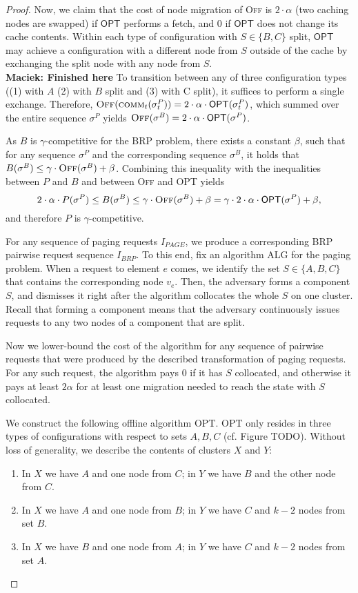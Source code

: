 \documentclass[manuscript,screen=true, review, anonymous]{acmart}
\newcommand{\OPT}{\textsf{OPT}\xspace}
\newcommand{\comm}{\textsc{comm}}
\newcommand{\OFF}{\textsc{Off}\xspace}
\newcommand\maciek[1]{\color{brown}\textbf{\\ Maciek: #1}\color{black}}
\begin{document}
\begin{proof}
Now, we claim that the cost of node migration of \OFF is $2 \cdot \alpha$ (two caching nodes are swapped) if $\OPT$ performs a fetch, and 0 if
$\OPT$ does not change its cache contents.
Within each type of configuration with $S \in \{ B, C\}$ split, $\OPT$ may achieve a configuration with a different node from $S$ outside of the cache by exchanging the split node with any node from $S$.
\maciek{Finished here}
To transition between any of three configuration types ((1) with $A$ (2) with $B$ split and (3) with C split), it suffices to perform a single exchange.
Therefore, $\OFF(\comm_t(\sigma^P_t)) = 2 \cdot \alpha \cdot \OPT(\sigma^P_t)$, which summed over the entire sequence $\sigma^P$ yields $\OFF(\sigma^B) = 2 \cdot \alpha \cdot \OPT(\sigma^P)$.

As $B$ is $\gamma$-competitive for the BRP problem, there exists a constant $\beta$, such that for any sequence $\sigma^P$ and the corresponding sequence $\sigma^B$, it holds that $B(\sigma^B) \leq \gamma \cdot \OFF(\sigma^B) +
\beta$.
Combining this inequality with the inequalities between $P$ and $B$ and between \OFF and \OPT yields
\[
	2 \cdot \alpha \cdot P(\sigma^P) \leq 
	B(\sigma^B) \leq \gamma \cdot \OFF(\sigma^B) + \beta
	 =\gamma \cdot 2 \cdot \alpha \cdot \OPT(\sigma^P) + \beta,
\]
and therefore $P$ is $\gamma$-competitive.
  \medskip

For any sequence of paging requests $I_{PAGE}$, we produce a corresponding BRP pairwise request sequence $I_{BRP}$.
To this end, fix an algorithm ALG for the paging problem.
When a request to element $e$ comes, we identify the set $S \in \{ A,B,C \}$ that contains the corresponding node $v_e$.
Then, the adversary forms a component $S$, and dismisses it right after the algorithm collocates the whole $S$ on one cluster.
Recall that forming a component means that the adversary continuously issues requests to any two nodes of a component that are split.

Now we lower-bound the cost of the algorithm for any sequence of pairwise requests that were produced by the described transformation of paging requests.
For any such request, the algorithm pays $0$ if it has $S$ collocated, and otherwise it pays at least $2\alpha$ for at least one migration needed to reach the state with $S$ collocated.

We construct the following offline algorithm OPT.
OPT only resides in three types of configurations with respect to sets $A,B,C$ (cf. Figure TODO).
Without loss of generality, we describe the contents of clusters $X$ and $Y$:
\begin{enumerate}
  \item In $X$ we have $A$ and one node from $C$; in $Y$ we have $B$ and the other node from $C$.
  \item In $X$ we have $A$ and one node from $B$; in $Y$ we have $C$ and $k-2$ nodes from set $B$.
  \item In $X$ we have $B$ and one node from $A$; in $Y$ we have $C$ and $k-2$ nodes from set $A$.
\end{enumerate}


\end{proof}
\end{document}
